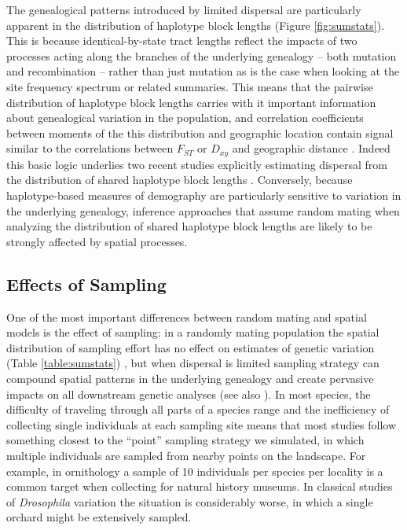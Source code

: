 \documentclass[10pt,twoside,lineno,hidelinks]{preprint}
\begin{document}
The genealogical patterns introduced by limited dispersal are particularly apparent in the distribution of haplotype block lengths (Figure \ref{fig:sumstats}). This is because identical-by-state tract lengths reflect the impacts of two processes acting along the branches of the underlying genealogy -- both mutation and recombination -- rather than just mutation as is the case when looking at the site frequency spectrum or related summaries. This means that the pairwise distribution of haplotype block lengths carries with it important information about genealogical variation in the population, and correlation coefficients between moments of the this distribution and geographic location contain signal similar to the correlations between $F_{ST}$ or $D_{xy}$ and geographic distance \citep{Rousset1997}. Indeed this basic logic underlies two recent studies explicitly estimating dispersal from the distribution of shared haplotype block lengths \citep{Ringbauer2017,Baharian2016}. Conversely, because haplotype-based measures of demography are particularly sensitive to variation in the underlying genealogy, inference approaches that assume random mating when analyzing the distribution of shared haplotype block lengths are likely to be strongly affected by spatial processes. 

\subsection{Effects of Sampling}

One of the most important differences between random mating and spatial models is the effect of sampling: 
in a randomly mating population the spatial distribution of sampling effort has no effect on estimates of genetic variation (Table \ref{table:sumstats}) , 
but when dispersal is limited sampling strategy can compound spatial patterns in the underlying genealogy and create pervasive impacts on all downstream genetic analyses (see also \citet{Stadler2009}). 
In most species,
the difficulty of traveling through all parts of a species range and the inefficiency of collecting single individuals at each sampling site 
means that most studies follow something closest to the ``point'' sampling strategy we simulated, 
in which multiple individuals are sampled from nearby points on the landscape. 
For example, in ornithology a sample of 10 individuals per species per locality is a common target when collecting for natural history museums. 
In classical studies of \textit{Drosophila} variation the situation is considerably worse, in which a single orchard might be extensively sampled.
\end{document}
